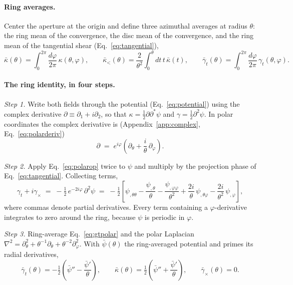 \documentclass[11pt]{article}
\numberwithin{equation}{section}
\begin{document}
\paragraph{Ring averages.}
Center the aperture at the origin and define three azimuthal
averages at radius $\theta$: the ring mean of the convergence, the
disc mean of the convergence, and the ring mean of the tangential
shear (Eq.~\eqref{eq:tangential}),
\begin{equation}
  \bar\kappa(\theta)
  = \int_0^{2\pi}\frac{d\varphi}{2\pi}\,
    \kappa(\theta,\varphi),
  \qquad
  \bar\kappa_<(\theta)
  = \frac{2}{\theta^2}\int_0^{\theta} d t\, t\,
    \bar\kappa(t),
  \qquad
  \bar\gamma_t(\theta)
  = \int_0^{2\pi}\frac{d\varphi}{2\pi}\,
    \gamma_t(\theta,\varphi) .
  \label{eq:ringdefs}
\end{equation}

\paragraph{The ring identity, in four steps.}
\emph{Step 1.}  Write both fields through the potential
(Eq.~\eqref{eq:potential}) using the complex derivative
$\partial \equiv \partial_1 + i\partial_2$, so that
$\kappa = \tfrac12\partial\partial^{*}\psi$ and
$\gamma = \tfrac12\partial^2\psi$.  In polar coordinates the complex
derivative is (Appendix~\ref{app:complex},
Eq.~\eqref{eq:polarderiv})
\begin{equation}
  \partial \;=\; e^{i\varphi}
  \left(\partial_\theta
  + \frac{i}{\theta}\,\partial_\varphi\right) .
  \label{eq:polarop}
\end{equation}

\emph{Step 2.}  Apply Eq.~\eqref{eq:polarop} twice to $\psi$ and
multiply by the projection phase of Eq.~\eqref{eq:tangential}.
Collecting terms,
\begin{equation}
  \gamma_t + i\gamma_\times
  \;=\; -\tfrac{1}{2}\, e^{-2i\varphi}\,\partial^2\psi
  \;=\; -\tfrac{1}{2}
  \left[
    \psi_{,\theta\theta}
    - \frac{\psi_{,\theta}}{\theta}
    - \frac{\psi_{,\varphi\varphi}}{\theta^2}
    + \frac{2i}{\theta}\,\psi_{,\theta\varphi}
    - \frac{2i}{\theta^2}\,\psi_{,\varphi}
  \right] ,
  \label{eq:gtpolar}
\end{equation}
where commas denote partial derivatives.  Every term containing a
$\varphi$-derivative integrates to zero around the ring, because
$\psi$ is periodic in $\varphi$.

\emph{Step 3.}  Ring-average Eq.~\eqref{eq:gtpolar} and the polar
Laplacian $\nabla^2 = \partial_\theta^2 +
\theta^{-1}\partial_\theta + \theta^{-2}\partial_\varphi^2$.  With
$\bar\psi(\theta)$ the ring-averaged potential and primes its radial
derivatives,
\begin{equation}
  \bar\gamma_t(\theta)
  = -\tfrac{1}{2}
  \left(\bar\psi'' - \frac{\bar\psi'}{\theta}\right),
  \qquad
  \bar\kappa(\theta)
  = \tfrac{1}{2}
  \left(\bar\psi'' + \frac{\bar\psi'}{\theta}\right),
  \qquad
  \bar\gamma_\times(\theta) = 0 .
  \label{eq:ringavg}
\end{equation}
\end{document}
